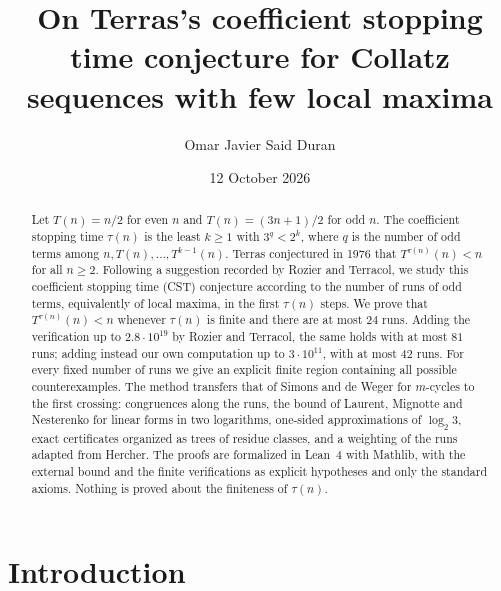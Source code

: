 \documentclass[11pt]{amsart}
\theoremstyle{definition}
\theoremstyle{remark}
\begin{document}
\title[CST with few local maxima]{On Terras's coefficient stopping time conjecture for Collatz sequences with few local maxima}

\author[O. J. Said Duran]{Omar Javier Said Duran}
\address{Independent Researcher, Calama, Chile}

\date{12 October 2026}

\begin{abstract}
Let $T(n)=n/2$ for even $n$ and $T(n)=(3n+1)/2$ for odd $n$. The coefficient stopping time $\tau(n)$ is the least $k\ge1$ with $3^{q}<2^{k}$, where $q$ is the number of odd terms among $n,T(n),\dots,T^{k-1}(n)$. Terras conjectured in 1976 that $T^{\tau(n)}(n)<n$ for all $n\ge2$. Following a suggestion recorded by Rozier and Terracol, we study this coefficient stopping time (CST) conjecture according to the number of runs of odd terms, equivalently of local maxima, in the first $\tau(n)$ steps. We prove that $T^{\tau(n)}(n)<n$ whenever $\tau(n)$ is finite and there are at most $24$ runs. Adding the verification up to $2.8\cdot10^{19}$ by Rozier and Terracol, the same holds with at most $81$ runs; adding instead our own computation up to $3\cdot10^{11}$, with at most $42$ runs. For every fixed number of runs we give an explicit finite region containing all possible counterexamples. The method transfers that of Simons and de Weger for $m$-cycles to the first crossing: congruences along the runs, the bound of Laurent, Mignotte and Nesterenko for linear forms in two logarithms, one-sided approximations of $\log_2 3$, exact certificates organized as trees of residue classes, and a weighting of the runs adapted from Hercher. The proofs are formalized in Lean~4 with Mathlib, with the external bound and the finite verifications as explicit hypotheses and only the standard axioms. Nothing is proved about the finiteness of $\tau(n)$.
\end{abstract}


\maketitle

\section{Introduction}\label{sec:intro}
\end{document}

